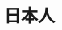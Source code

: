 \documentclass{article}
\begin{document}
\begin{CJK}{UTF8}{min}
\chapter{日本人}
\section{}


\end{CJK}
\end{document}
